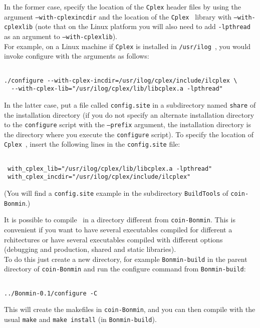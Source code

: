 In the former case, specify the location of the {\tt Cplex} header files by using the
argument {\tt --with-cplexincdir} and the location of the
{\tt Cplex } library with {\tt --with-cplexlib} (note that on the Linux platform you will also
need to add {\tt -lpthread} as an argument to {\tt --with-cplexlib}).\\

For example, on a Linux machine if {\tt Cplex} is installed in {\tt /usr/ilog}~, you would
invoke configure with the arguments as follows:
\begin{verbatim}

./configure --with-cplex-incdir=/usr/ilog/cplex/include/ilcplex \
  --with-cplex-lib="/usr/ilog/cplex/lib/libcplex.a -lpthread"
 \end{verbatim}
In the latter case, put a file called {\tt config.site} in a subdirectory named
{\tt share} of the installation directory (if you do not specify an alternate
installation directory to the {\tt configure} script with the {\tt --prefix}
argument, the installation directory is the directory where you execute the
{\tt configure} script). To specify the location of {\tt Cplex}~, insert the
following lines in the {\tt config.site} file:
 \begin{verbatim}

 with_cplex_lib="/usr/ilog/cplex/lib/libcplex.a -lpthread"
 with_cplex_incdir="/usr/ilog/cplex/include/ilcplex"
 \end{verbatim}
 (You will find a {\tt config.site} example in the subdirectory {\tt BuildTools} of {\tt coin-Bonmin}.)

It is possible to compile \Bonmin\ in a directory different from {\tt coin-Bonmin}.
This is convenient if you want to have several executables compiled for different a
rchitectures or have several executables compiled with different options
(debugging and production, shared and static libraries).\\

To do this just create a new directory, for example {\tt Bonmin-build} in the parent directory of
{\tt coin-Bonmin} and run the configure command from {\tt Bonmin-build}:
\begin{verbatim}

../Bonmin-0.1/configure -C

\end{verbatim}
This will create the makefiles in {\tt coin-Bonmin}, and
you can then compile with the usual {\tt make} and {\tt make install}
(in {\tt Bonmin-build}).

